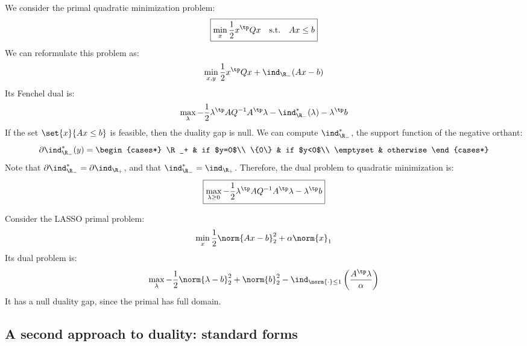 \begin{example}
    We consider the primal quadratic minimization problem:
    \begin{equation*}
        \boxed{\min_x \frac{1}{2}x^\tp Qx \quad\text{s.t.}\quad Ax\leq b}
    \end{equation*}
    We can reformulate this problem as:
    \begin{equation*}
        \min_{x, y} \frac{1}{2}x^\tp Qx + \ind_{\R_-}(Ax-b)
    \end{equation*}
    Its Fenchel dual is:
    \begin{equation*}
        \max_\lambda -\frac{1}{2}\lambda^\tp AQ^{-1}A^\tp\lambda - \ind_{\R_-}^*(\lambda) - \lambda^\tp b
    \end{equation*}
    If the set $\set{x}{Ax\leq b}$ is feasible, then the duality gap is null. We can compute $\ind_{\R_-}^*$, the support function of the negative orthant:
    \begin{equation*}
        \partial\ind_{\R_-}^*(y) = \begin{cases*}
            \R_+ & if $y=0$\\
            \{0\} & if $y<0$\\
            \emptyset & otherwise
        \end{cases*}
    \end{equation*}
    Note that $\partial\ind_{\R_-}^* = \partial\ind_{\R_+}$, and that $\ind_{\R_-}^* = \ind_{\R_+}$. Therefore, the dual problem to quadratic minimization is:
    \begin{equation}
        \boxed{\max_{\lambda\geq0} -\frac{1}{2}\lambda^\tp AQ^{-1}A^\tp\lambda - \lambda^\tp b}
    \end{equation}
\end{example}

\begin{example}[LASSO]
    Consider the LASSO primal problem:
    \begin{equation*}
        \min_x \frac{1}{2}\norm{Ax-b}_2^2 + \alpha\norm{x}_1
    \end{equation*}
    Its dual problem is:
    \begin{equation*}
        \max_\lambda -\frac{1}{2}\norm{\lambda-b}_2^2 + \norm{b}_2^2 - \ind_{\norm{\cdot}\leq1}\left(\frac{A^\tp\lambda}{\alpha}\right)
    \end{equation*}
    It has a null duality gap, since the primal has full domain.
\end{example}

\subsection{A second approach to duality: standard forms}